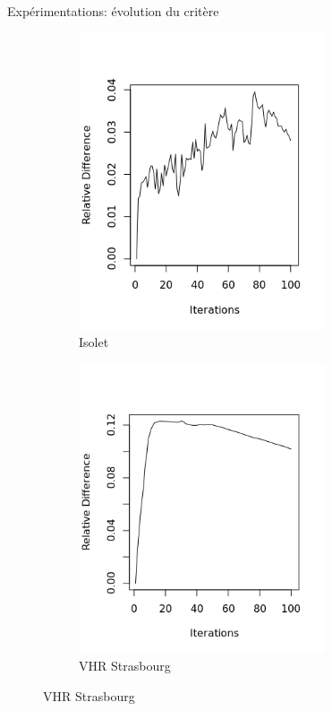 \documentclass[hyperref={pdfpagelabels=false}]{beamer}
\begin{document}
\begin{frame}{Expérimentations: évolution du critère}
\begin{figure}[!h]
\begin{subfigure}[b]{0.32\textwidth}
                \includegraphics[width=0.8\textwidth]{isolet_RD2}
                \caption{Isolet}
            \end{subfigure}
            \begin{subfigure}[b]{0.32\textwidth}
                \centering
                \includegraphics[width=0.8\textwidth]{vhr_RD}
                \caption{VHR Strasbourg}
            \end{subfigure}
        \end{figure}


\end{frame}
\end{document}

